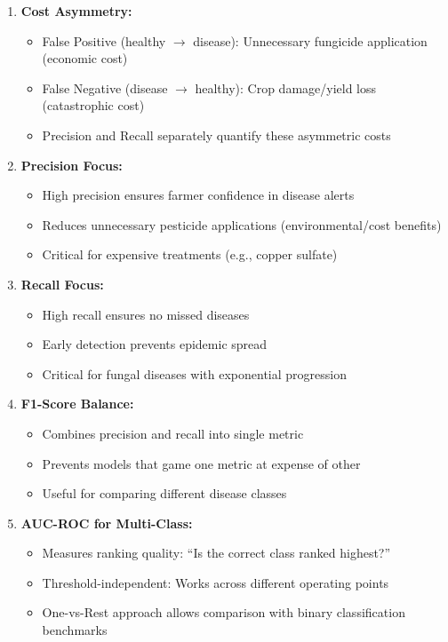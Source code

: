 \documentclass[11pt,a4paper]{article}
\begin{document}
\begin{enumerate}
    \item \textbf{Cost Asymmetry:} 
    \begin{itemize}
        \item False Positive (healthy $\rightarrow$ disease): Unnecessary fungicide application (economic cost)
        \item False Negative (disease $\rightarrow$ healthy): Crop damage/yield loss (catastrophic cost)
        \item Precision and Recall separately quantify these asymmetric costs
    \end{itemize}
    
    \item \textbf{Precision Focus:}
    \begin{itemize}
        \item High precision ensures farmer confidence in disease alerts
        \item Reduces unnecessary pesticide applications (environmental/cost benefits)
        \item Critical for expensive treatments (e.g., copper sulfate)
    \end{itemize}
    
    \item \textbf{Recall Focus:}
    \begin{itemize}
        \item High recall ensures no missed diseases
        \item Early detection prevents epidemic spread
        \item Critical for fungal diseases with exponential progression
    \end{itemize}
    
    \item \textbf{F1-Score Balance:}
    \begin{itemize}
        \item Combines precision and recall into single metric
        \item Prevents models that game one metric at expense of other
        \item Useful for comparing different disease classes
    \end{itemize}
    
    \item \textbf{AUC-ROC for Multi-Class:}
    \begin{itemize}
        \item Measures ranking quality: ``Is the correct class ranked highest?''
        \item Threshold-independent: Works across different operating points
        \item One-vs-Rest approach allows comparison with binary classification benchmarks
    \end{itemize}
\end{enumerate}
\end{document}
